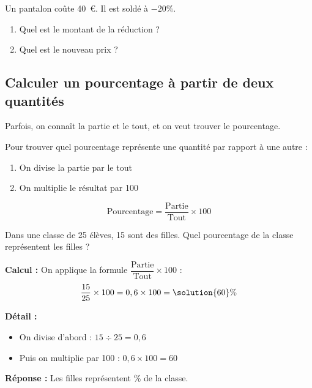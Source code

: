 \begin{activitybox}
	Un pantalon coûte 40~€. Il est soldé à $-20\%$.
	\begin{enumerate}
		\item Quel est le montant de la réduction ?


		\item Quel est le nouveau prix ?

	\end{enumerate}
\end{activitybox}

\subsection{Calculer un pourcentage à partir de deux quantités}

Parfois, on connaît la partie et le tout, et on veut trouver le pourcentage.

\begin{methodebox}
	Pour trouver quel pourcentage représente une quantité par rapport à une autre :
	\begin{enumerate}
		\item On divise la partie par le tout
		\item On multiplie le résultat par 100
	\end{enumerate}
	$$\text{Pourcentage} = \dfrac{\text{Partie}}{\text{Tout}} \times 100$$
\end{methodebox}

\begin{examplebox}[Application]
	Dans une classe de 25 élèves, 15 sont des filles. Quel pourcentage de la classe représentent les filles ?

	\textbf{Calcul :} On applique la formule $\dfrac{\text{Partie}}{\text{Tout}} \times 100$ :
	$$\dfrac{15}{25} \times 100 = 0,6 \times 100 = \solution{60}\%$$

	\textbf{Détail :}
	\begin{itemize}
		\item On divise d'abord : $15 \div 25 = 0,6$
		\item Puis on multiplie par 100 : $0,6 \times 100 = 60$
	\end{itemize}

	\textbf{Réponse :} Les filles représentent \% de la classe.
\end{examplebox}

